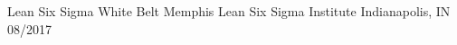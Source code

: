 \begin{cventries}
  \cventry
    {Lean Six Sigma White Belt} %
    {Memphis Lean Six Sigma Institute} %
    {Indianapolis, IN} %
    {08/2017} %
    {
      \begin{cvitems} %
        \item {}
      \end{cvitems}
    }
%


%
\end{cventries}
